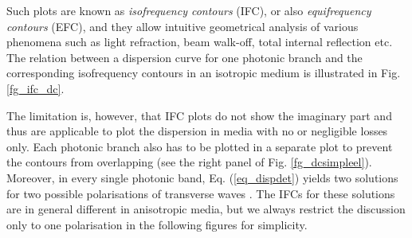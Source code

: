 Such plots are known as \textit{isofrequency contours} (IFC), or also \textit{equifrequency contours} (EFC), and they allow intuitive geometrical analysis \cite{lindell2001bw} of various phenomena such as light refraction, beam walk-off, total internal reflection etc. 
The relation between a dispersion curve for one photonic branch and the corresponding isofrequency contours in an isotropic medium is illustrated in Fig. \ref{fg_ifc_dc}.

The limitation is, however, that IFC plots do not show the imaginary part and thus are applicable to plot the dispersion in media with no or negligible losses only.  
Each photonic branch also has to be plotted in a separate plot to prevent the contours from overlapping (see the right panel of Fig. \ref{fg_dcsimpleel}). 
Moreover, in every single photonic band, Eq. (\ref{eq_dispdet}) yields two solutions for two possible polarisations of transverse waves \cite[p. 46]{klingshirn2007semiconductor}. The IFCs for these solutions are in general different in anisotropic media, but we always restrict the discussion only to one polarisation in the following figures for simplicity. 

